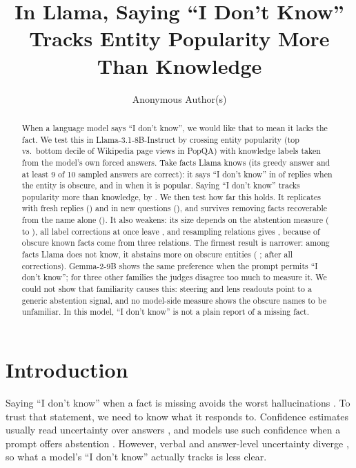 \documentclass[manuscript,screen,review,anonymous,nonacm]{acmart}
\newcommand{\idk}{``I don't know''}
\begin{document}
\title{In Llama, Saying ``I Don't Know'' Tracks Entity Popularity More Than Knowledge}
\author{Anonymous Author(s)}

\begin{abstract}
When a language model says \idk, we would like that to mean it lacks the fact. We test this in Llama-3.1-8B-Instruct by crossing entity popularity (top vs.\ bottom decile of Wikipedia page views in PopQA) with knowledge labels taken from the model's own forced answers. Take facts Llama knows (its greedy answer and at least 9 of 10 sampled answers are correct): it says \idk{} in \tcObsKnownAbsPct{} of replies when the entity is obscure, and in \tcPopKnownAbsPct{} when it is popular. Saying \idk{} tracks popularity more than knowledge, by \hmLlamaDiff{} \hmLlamaDiffCI. We then test how far this holds. It replicates with fresh replies (\frDiff) and in new questions (\nqDiff), and survives removing facts recoverable from the name alone (\ncDiff). It also weakens: its size depends on the abstention measure (\hjLlamaDiff{} to \faLlamaRegexDiff), all label corrections at once leave \rcJoint{} \rcJointCI, and resampling relations gives \rcClusCI, because \rcTopThree{} of \gsObsKnownTotal{} obscure known facts come from three relations. The firmest result is narrower: among facts Llama does not know, it abstains more on obscure entities (\rcUnk{} \rcUnkCI; \rcUnkJoint{} \rcUnkJointCI{} after all corrections). Gemma-2-9B shows the same preference when the prompt permits \idk; for three other families the judges disagree too much to measure it. We could not show that familiarity causes this: steering and lens readouts point to a generic abstention signal, and no model-side measure shows the obscure names to be unfamiliar. In this model, \idk{} is not a plain report of a missing fact.
\end{abstract}


\maketitle

\section{Introduction}

Saying \idk{} when a fact is missing avoids the worst hallucinations \cite{kalai2025hallucinate}. To trust that statement, we need to know what it responds to. Confidence estimates usually read uncertainty over answers \cite{kadavath2022know,kuhn2023semantic,stolfo2024confidence}, and models use such confidence when a prompt offers abstention \cite{kumaran2026confidence}. However, verbal and answer-level uncertainty diverge \cite{ji2025hedging}, so what a model's \idk{} actually tracks is less clear.
\end{document}
